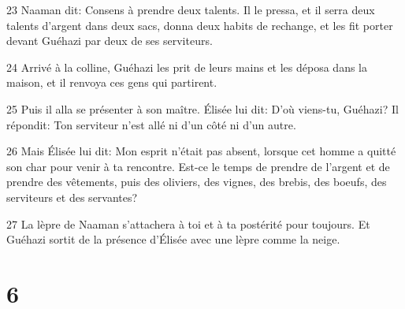 \par 23 Naaman dit: Consens à prendre deux talents. Il le pressa, et il serra deux talents d'argent dans deux sacs, donna deux habits de rechange, et les fit porter devant Guéhazi par deux de ses serviteurs.
\par 24 Arrivé à la colline, Guéhazi les prit de leurs mains et les déposa dans la maison, et il renvoya ces gens qui partirent.
\par 25 Puis il alla se présenter à son maître. Élisée lui dit: D'où viens-tu, Guéhazi? Il répondit: Ton serviteur n'est allé ni d'un côté ni d'un autre.
\par 26 Mais Élisée lui dit: Mon esprit n'était pas absent, lorsque cet homme a quitté son char pour venir à ta rencontre. Est-ce le temps de prendre de l'argent et de prendre des vêtements, puis des oliviers, des vignes, des brebis, des boeufs, des serviteurs et des servantes?
\par 27 La lèpre de Naaman s'attachera à toi et à ta postérité pour toujours. Et Guéhazi sortit de la présence d'Élisée avec une lèpre comme la neige.

\chapter{6}


